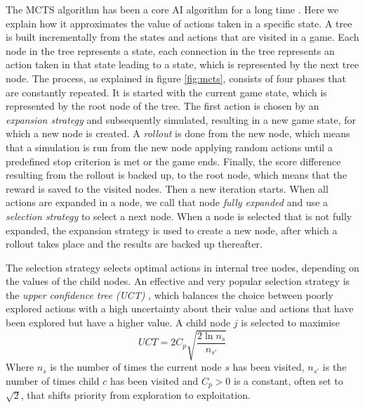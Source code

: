 \label{subsec:mcts}
The MCTS algorithm has been a core AI algorithm for a long time
\cite{browne2012survey}. Here we explain how it approximates the value
of actions taken in a specific state. A tree is built incrementally from
the states and actions that are visited in a game. Each node in the tree
represents a state, each connection in the tree represents an action taken in
that state leading to a state, which is represented by the next tree node. 
The process, as explained in figure \ref{fig:mcts}, consists of four phases that
are constantly repeated. It is started with the current game state, which is
represented by the root node of the tree. The first action is chosen by an
\emph{expansion strategy} and subsequently simulated, resulting in a new game
state, for which a new node is created. A \emph{rollout} is done from the new
node, which means that a simulation is run from the new node applying random
actions until a predefined stop criterion is met or the game ends. Finally, the
score difference resulting from the rollout is backed up, to the root node,
which means that the reward is saved to the visited nodes. Then a new iteration
starts. When all actions are expanded in a node, we call that node \emph{fully
expanded} and use a \emph{selection strategy} to select a next node. When a node
is selected that is not fully expanded, the expansion strategy is used to create
a new node, after which a rollout takes place and the results are backed up
thereafter.

The selection strategy selects optimal actions in internal tree nodes, depending
on the values of the child nodes. An effective and very popular selection
strategy is the \emph{upper confidence tree (UCT)} \cite{kocsis2006bandit},
which balances the choice between poorly explored actions with a high
uncertainty about their value and actions that have been explored but have a
higher value. A child node $j$ is selected to maximise
\begin{equation}
	\label{eq:uct}
	UCT = 2C_p \sqrt{\frac{2 \ln n_s}{n_{s'}}}
\end{equation}
Where $n_s$ is the number of times the current node $s$ has been visited,
$n_{s'}$ is the number of times child $c$ has been visited and $C_p > 0$ is a
constant, often set to $\sqrt{2}$, that shifts priority from exploration to
exploitation.

